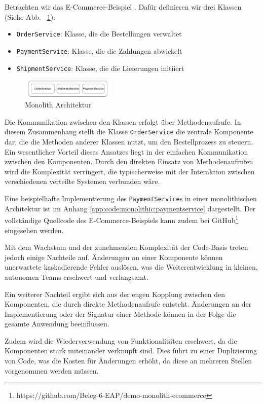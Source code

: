 \documentclass[acmtog]{acmart}
\begin{document}
Betrachten wir das E-Commerce-Beispiel .
Dafür definieren wir drei Klassen (Siehe Abb. ~\ref{fig:mono}):
\begin{itemize}
  \item \texttt{OrderService}: Klasse, die die Bestellungen verwaltet
  \item \texttt{PaymentService}: Klasse, die die Zahlungen abwickelt
  \item \texttt{ShipmentService}: Klasse, die die Lieferungen initiiert
\end{itemize}

\begin{figure}[h!]
  \centering
  \includegraphics[width=0.4\textwidth]{images/mono/mono.pdf}
  \caption{Monolith Architektur}
  \label{fig:mono}
\end{figure}

Die Kommunikation zwischen den Klassen erfolgt über Methodenaufrufe. In diesem
Zusammenhang stellt die Klasse \texttt{OrderService} die zentrale Komponente dar,
die die Methoden anderer Klassen nutzt, um den Bestellprozess zu steuern. Ein
wesentlicher Vorteil dieses Ansatzes liegt in der einfachen Kommunikation
zwischen den Komponenten.
Durch den direkten Einsatz von Methodenaufrufen
wird die Komplexität verringert, die typischerweise mit der Interaktion zwischen
verschiedenen verteilte Systemen verbunden wäre.

Eine beispielhafte Implementierung des \texttt{PaymentService}s  in einer monolithischen
Architektur ist im Anhang \ref{app:code:monolithic:paymentservice} dargestellt.
Der vollständige Quellcode des E-Commerce-Beispiels kann zudem bei GitHub\footnote{https://github.com/Beleg-6-EAP/demo-monolith-ecommerce}
eingesehen werden.

Mit dem Wachstum und der zunehmenden Komplexität der Code-Basis treten jedoch
einige Nachteile auf.
Änderungen an einer Komponente können unerwartete kaskadierende
Fehler auslösen, was die Weiterentwicklung in kleinen, autonomen Teams erschwert
und verlangsamt.

Ein weiterer Nachteil ergibt sich aus der engen Kopplung zwischen den Komponenten,
die durch direkte Methodenaufrufe entsteht.
Änderungen an der Implementierung oder
der Signatur einer Methode können in der Folge die gesamte Anwendung beeinflussen.

Zudem wird die Wiederverwendung von Funktionalitäten erschwert, da die Komponenten
stark miteinander verknüpft sind.
Dies führt zu einer Duplizierung von Code, was die Kosten für Änderungen erhöht,
da diese an mehreren Stellen vorgenommen werden müssen.
\end{document}
